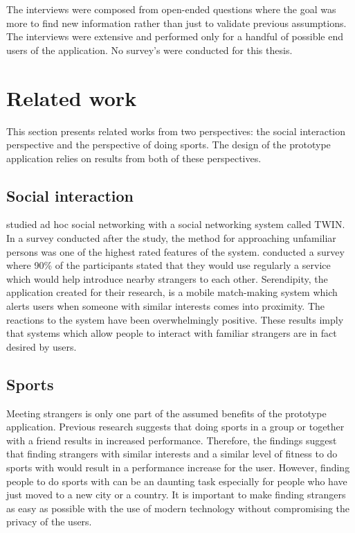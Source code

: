 The interviews were composed from open-ended questions where the goal was more to find new information rather than just to validate previous assumptions. The interviews were extensive and performed only for a handful of possible end users of the application. No survey's were conducted for this thesis.

\section{Related work}

This section presents related works from two perspectives: the social interaction perspective and the perspective of doing sports. The design of the prototype application relies on results from both of these perspectives.

\subsection{Social interaction}

\cite{socialAdHoc} studied ad hoc social networking with a social networking system called TWIN. In a survey conducted after the study, the method for approaching unfamiliar persons was one of the highest rated features of the system. \cite{mobileMatchmaking} conducted a survey where 90\% of the participants stated that they would use regularly a service which would help introduce nearby strangers to each other. Serendipity, the application created for their research, is a mobile match-making system which alerts users when someone with similar interests comes into proximity. The reactions to the system have been overwhelmingly positive. These results imply that systems which allow people to interact with familiar strangers are in fact desired by users.

\subsection{Sports}

Meeting strangers is only one part of the assumed benefits of the prototype application. Previous research suggests that doing sports in a group or together with a friend results in increased performance. Therefore, the findings suggest that finding strangers with similar interests and a similar level of fitness to do sports with would result in a performance increase for the user. However, finding people to do sports with can be an daunting task especially for people who have just moved to a new city or a country. It is important to make finding strangers as easy as possible with the use of modern technology without compromising the privacy of the users.


